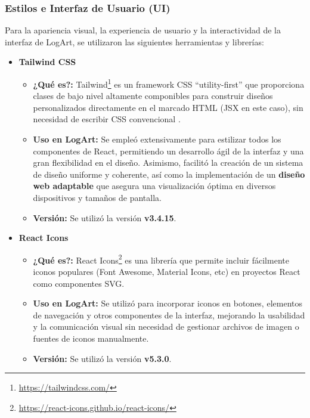 \subsubsection{Estilos e Interfaz de Usuario (UI)}
\label{sec:estilosUiFrontend}

Para la apariencia visual, la experiencia de usuario y la interactividad de la interfaz de LogArt, se utilizaron las siguientes herramientas y librerías:

    \begin{itemize}
        \item \textbf{Tailwind CSS}
            \begin{itemize}
                \item \textbf{¿Qué es?:} Tailwind\footnote{\url{https://tailwindcss.com/}} es un framework CSS ``utility-first'' que proporciona clases de bajo nivel altamente componibles para construir diseños personalizados directamente en el marcado HTML (JSX en este caso), sin necesidad de escribir CSS convencional \cite{vabadusTailwindIntro}.
                \item \textbf{Uso en LogArt:} Se empleó extensivamente para estilizar todos los componentes de React, permitiendo un desarrollo ágil de la interfaz y una gran flexibilidad en el diseño. Asimismo, facilitó la creación de un sistema de diseño uniforme y coherente, así como la implementación de un \textbf{diseño web adaptable} que asegura una visualización óptima en diversos dispositivos y tamaños de pantalla.
                \item \textbf{Versión:} Se utilizó la versión \textbf{v3.4.15}.
            \end{itemize}
        \vspace{0.3cm}
        \item \textbf{React Icons}
            \begin{itemize}
                \item \textbf{¿Qué es?:} React Icons\footnote{\url{https://react-icons.github.io/react-icons/}} es una librería que permite incluir fácilmente iconos populares (Font Awesome, Material Icons, etc) en proyectos React como componentes SVG.
                \item \textbf{Uso en LogArt:} Se utilizó para incorporar iconos en botones, elementos de navegación y otros componentes de la interfaz, mejorando la usabilidad y la comunicación visual sin necesidad de gestionar archivos de imagen o fuentes de iconos manualmente.
                \item \textbf{Versión:} Se utilizó la versión \textbf{v5.3.0}.
            \end{itemize}
    \end{itemize}

